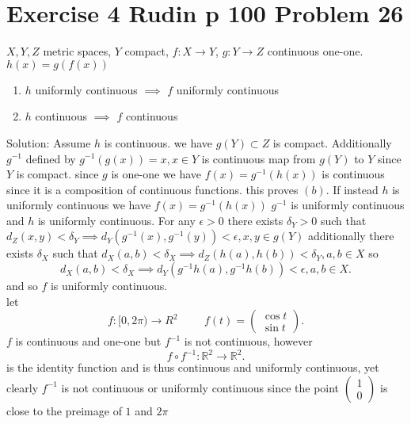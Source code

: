 \documentclass[11pt]{article}
\newcommand{\solution}[1]{{{\textcolor{header}{Solution:} \textcolor{solution}{#1}}}}
\begin{document}
\section{Exercise 4 Rudin p 100 Problem 26}
$X,Y,Z$ metric spaces, $Y$ compact, $f: X \rightarrow Y$, $g : Y \rightarrow Z$ continuous one-one. $h(x) = g(f(x))$
\begin{enumerate}
    \item $h$ uniformly continuous $\implies$ $f$ uniformly continuous
    \item $h$ continuous $\implies$ $f$ continuous
\end{enumerate}
\solution{
     Assume $h$ is continuous. we have $g(Y) \subset Z$ is compact. Additionally $g^{-1}$ defined by $g^{-1}(g(x)) = x, x \in Y$ is continuous map from $g(Y)$ to $Y$ since $Y$ is compact.
    since $g$ is one-one we have $f(x) = g^{-1}(h(x))$ is continuous since it is a composition of continuous functions. this proves $(b)$.
    If instead $h$ is uniformly continuous we have $f(x) = g^{-1}(h(x))$ $g^{-1}$ is uniformly continuous and $h$ is uniformly continuous. For any $\epsilon > 0$ there exists
    $ \delta_Y > 0$ such that $d_Z(x,y) < \delta_Y \implies d_Y(g^{-1}(x),g^{-1}(y)) < \epsilon, x,y \in g(Y)$ additionally there exists $\delta_X$ such that
    $d_X(a,b) < \delta_X \implies d_Z(h(a),h(b)) < \delta_Y, a,b \in X$ so
    \[
    d_X(a,b) < \delta_X \implies d_Y(g^{-1}h(a),g^{-1}h(b)) < \epsilon, a,b \in X
    .\] 
    and so $f$ is uniformly continuous.\\
    let
    \[
        f: [0,2\pi) \rightarrow R^2 \hspace{1cm} f(t) = \begin{pmatrix} \cos t\\ \sin t \end{pmatrix} 
    .\] 
    $f$ is continuous and one-one but $f^{-1}$ is not continuous, however
    \[
    f \circ f^{-1} : \mathbb{R}^2 \rightarrow \mathbb{R}^2
    .\] 
    is the identity function and is thus continuous and uniformly continuous, yet clearly $f^{-1}$ is not continuous or uniformly continuous since the point $\begin{pmatrix} 1 \\ 0 \end{pmatrix} $ is close
    to the preimage of $1$ and $2\pi$
}
\end{document}
